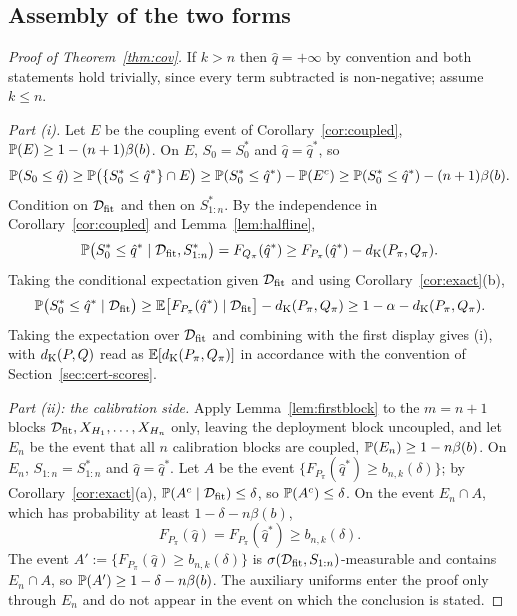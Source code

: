 \documentclass[../../../main.tex]{subfiles}
\begin{document}
\subsection{Assembly of the two forms}\label{sec:assemble}

\begin{proof}[Proof of Theorem~\ref{thm:cov}]
If $k>n$ then $\hat q=+\infty$ by convention and both statements hold trivially, since every term subtracted is non-negative; assume $k\le n$.

\emph{Part (i).} Let $E$ be the coupling event of Corollary~\ref{cor:coupled}, $\mathbb{P}(E)\ge1-(n+1)\beta(b)$. On $E$, $S_0=S^*_0$ and $\hat q=\hat q^*$, so
\[
\mathbb{P}(S_0\le\hat q)\ge\mathbb{P}\big(\{S^*_0\le\hat q^*\}\cap E\big)\ge\mathbb{P}(S^*_0\le\hat q^*)-\mathbb{P}(E^c)\ge\mathbb{P}(S^*_0\le\hat q^*)-(n+1)\beta(b).
\]
Condition on $\mathcal D_{\mathrm{fit}}$ and then on $S^*_{1:n}$. By the independence in Corollary~\ref{cor:coupled} and Lemma~\ref{lem:halfline},
\[
\mathbb{P}\big(S^*_0\le\hat q^*\mid\mathcal D_{\mathrm{fit}},S^*_{1:n}\big)=F_{Q_\pi}(\hat q^*)\ge F_{P_\pi}(\hat q^*)-d_{\mathrm{K}}(P_\pi,Q_\pi).
\]
Taking the conditional expectation given $\mathcal D_{\mathrm{fit}}$ and using Corollary~\ref{cor:exact}(b),
\[
\mathbb{P}\big(S^*_0\le\hat q^*\mid\mathcal D_{\mathrm{fit}}\big)\ge\mathbb{E}\big[F_{P_\pi}(\hat q^*)\mid\mathcal D_{\mathrm{fit}}\big]-d_{\mathrm{K}}(P_\pi,Q_\pi)\ge1-\alpha-d_{\mathrm{K}}(P_\pi,Q_\pi).
\]
Taking the expectation over $\mathcal D_{\mathrm{fit}}$ and combining with the first display gives (i), with $d_{\mathrm{K}}(P,Q)$ read as $\mathbb{E}[d_{\mathrm{K}}(P_\pi,Q_\pi)]$ in accordance with the convention of Section~\ref{sec:cert-scores}.

\emph{Part (ii): the calibration side.} Apply Lemma~\ref{lem:firstblock} to the $m=n+1$ blocks $\mathcal D_{\mathrm{fit}},X_{H_1},\dots,X_{H_n}$ only, leaving the deployment block uncoupled, and let $E_n$ be the event that all $n$ calibration blocks are coupled, $\mathbb{P}(E_n)\ge1-n\beta(b)$. On $E_n$, $S_{1:n}=S^*_{1:n}$ and $\hat q=\hat q^*$. Let $A$ be the event $\{F_{P_\pi}(\hat q^*)\ge b_{n,k}(\delta)\}$; by Corollary~\ref{cor:exact}(a), $\mathbb{P}(A^c\mid\mathcal D_{\mathrm{fit}})\le\delta$, so $\mathbb{P}(A^c)\le\delta$. On the event $E_n\cap A$, which has probability at least $1-\delta-n\beta(b)$,
\begin{equation}\label{eq:calside}
F_{P_\pi}(\hat q)=F_{P_\pi}(\hat q^*)\ge b_{n,k}(\delta).
\end{equation}
The event $A':=\{F_{P_\pi}(\hat q)\ge b_{n,k}(\delta)\}$ is $\sigma(\mathcal D_{\mathrm{fit}},S_{1:n})$-measurable and contains $E_n\cap A$, so $\mathbb{P}(A')\ge1-\delta-n\beta(b)$. The auxiliary uniforms enter the proof only through $E_n$ and do not appear in the event on which the conclusion is stated.


\end{proof}
\end{document}
